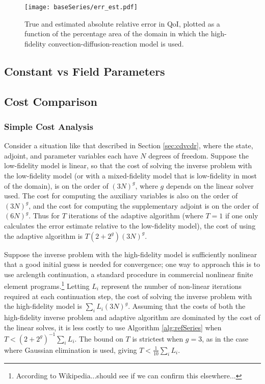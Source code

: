 \begin{figure}[h]
\centering
\texttt{[image: baseSeries/err\_est.pdf]}
\caption{True and estimated absolute relative error in QoI, plotted as a function of the percentage area of the domain in which the high-fidelity convection-diffusion-reaction model is used.}
\label{fig:baseErr}
\end{figure}

\subsection{Constant vs Field Parameters}

\subsection{Cost Comparison}

\subsubsection{Simple Cost Analysis}

Consider a situation like that described in Section \ref{sec:cdvcdr}, where the state, adjoint, and parameter variables each have $N$ degrees of freedom. Suppose the low-fidelity model is linear, so that the cost of solving the inverse problem with the low-fidelity model (or with a mixed-fidelity model that is low-fidelity in most of the domain), is on the order of $(3N)^g$, where $g$ depends on the linear solver used. The cost for computing the auxiliary variables is also on the order of $(3N)^g$, and the cost for computing the supplementary adjoint is on the order of $(6N)^g$. Thus for $T$ iterations of the adaptive algorithm (where $T=1$ if one only calculates the error estimate relative to the low-fidelity model), the cost of using the adaptive algorithm is $T(2+2^g)(3N)^g$.

Suppose the inverse problem with the high-fidelity model is sufficiently nonlinear that a good initial guess is needed for convergence; one way to approach this is to use arclength continuation, a standard procedure in commercial nonlinear finite element programs.\footnote{According to Wikipedia...should see if we can confirm this elsewhere...} Letting $L_i$ represent the number of non-linear iterations required at each continuation step, the cost of solving the inverse problem with the high-fidelity model is $\sum_i L_i (3N)^g$. Assuming that the costs of both the high-fidelity inverse problem and adaptive algorithm are dominated by the cost of the linear solves, it is less costly to use Algorithm \ref{alg:refSeries} when $T<(2+2^g)^{-1}\sum_i L_i$. The bound on $T$ is strictest when $g=3$, as in the case where Gaussian elimination is used, giving $T<\frac{1}{10}\sum_i L_i$.

